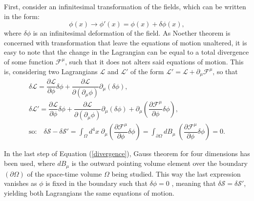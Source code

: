 First, consider an infinitesimal transformation of the fields, which can be written in the form:
\begin{equation}
    \label{changeoffields}
    \phi(x) \rightarrow \phi'(x) = \phi(x) + \delta\phi(x),
\end{equation}
where $\delta\phi$ is an infinitesimal deformation of the field. As Noether theorem is concerned with transformation that leave the equations of motion unaltered, it is easy to note that the change in the Lagrangian can be equal to a total divergence of some function $\mathcal{F}^{\mu}$, such that it does not alters said equations of motion. This is, considering two Lagrangians $\mathcal{L}$ and $\mathcal{L}'$ of the form $\mathcal{L'} = \mathcal{L} + \partial_{\mu}\mathcal{F}^{\mu}$, so that
\begin{gather}
    \delta\mathcal{L} = \dfrac{\partial\mathcal{L}}{\partial\phi}\delta\phi + \dfrac{\partial\mathcal{L}}{\partial(\partial_{\mu}\phi)}\partial_{\mu}(\delta\phi), \nonumber \\
    \delta\mathcal{L}' = \dfrac{\partial\mathcal{L}}{\partial\phi}\delta\phi + \dfrac{\partial\mathcal{L}}{\partial(\partial_{\mu}\phi)}\partial_{\mu}(\delta\phi) + \partial_{\mu}\left( \dfrac{\partial\mathcal{F^{\mu}}}{\partial\phi}\delta\phi \right), \nonumber \\
    \label{divergence}
    \textrm{so:} \quad \delta\mathcal{S} - \delta\mathcal{S}' = \int_{\Omega} d^4x \; \partial_{\mu}\left( \dfrac{\partial\mathcal{F^{\mu}}}{\partial\phi}\delta\phi \right) = \int_{\partial\Omega} dB_{\mu} \; \left( \dfrac{\partial\mathcal{F^{\mu}}}{\partial\phi}\delta\phi \right) = 0.
\end{gather}

In the last step of Equation (\ref{divergence}), Gauss theorem for four dimensions has been used, where $dB_{\mu}$ is the outward pointing volume element over the boundary $(\partial\Omega)$ of the space-time volume $\Omega$ being studied. This way the last expression vanishes as $\phi$ is fixed in the boundary such that $\delta\phi = 0$ \cite{Lahiri}\cite{Mandl}, meaning that $\delta\mathcal{S} = \delta\mathcal{S}'$, yielding both Lagrangians the same equations of motion.

